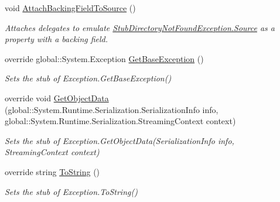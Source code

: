 \begin{DoxyCompactItemize}
void \hyperlink{class_system_1_1_i_o_1_1_fakes_1_1_stub_directory_not_found_exception_a76cca75dfa7cad8238de011df8a3ca7a}{Attach\-Backing\-Field\-To\-Source} ()
\begin{DoxyCompactList}\small\item\em Attaches delegates to emulate \hyperlink{class_system_1_1_i_o_1_1_fakes_1_1_stub_directory_not_found_exception_af13b17141aae06db60ce48e9973eb16b}{Stub\-Directory\-Not\-Found\-Exception.\-Source} as a property with a backing field.\end{DoxyCompactList}\item 
override global\-::\-System.\-Exception \hyperlink{class_system_1_1_i_o_1_1_fakes_1_1_stub_directory_not_found_exception_a6ceaa279f8e5e5033c6afeb7e6d339c4}{Get\-Base\-Exception} ()
\begin{DoxyCompactList}\small\item\em Sets the stub of Exception.\-Get\-Base\-Exception()\end{DoxyCompactList}\item 
override void \hyperlink{class_system_1_1_i_o_1_1_fakes_1_1_stub_directory_not_found_exception_a53aefa0d4121fc5908b1d9197bc2ad00}{Get\-Object\-Data} (global\-::\-System.\-Runtime.\-Serialization.\-Serialization\-Info info, global\-::\-System.\-Runtime.\-Serialization.\-Streaming\-Context context)
\begin{DoxyCompactList}\small\item\em Sets the stub of Exception.\-Get\-Object\-Data(\-Serialization\-Info info, Streaming\-Context context)\end{DoxyCompactList}\item 
override string \hyperlink{class_system_1_1_i_o_1_1_fakes_1_1_stub_directory_not_found_exception_a13affb70e18dc8ecdb5a5efe8181b7dc}{To\-String} ()
\begin{DoxyCompactList}\small\item\em Sets the stub of Exception.\-To\-String()\end{DoxyCompactList}\end{DoxyCompactItemize}
